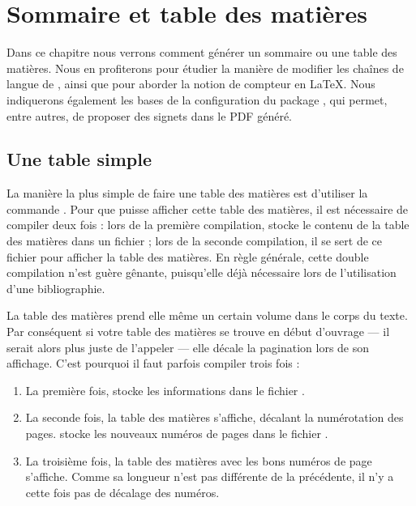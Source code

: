 \chapter{Sommaire et table des matières}\label{toc}

\begin{intro}
Dans ce chapitre nous verrons comment générer un sommaire ou une table des matières. Nous en profiterons pour étudier la manière de modifier les chaînes de langue de , ainsi que pour aborder la notion de compteur en \LaTeX{}. Nous indiquerons également les bases de la configuration du package , qui permet, entre autres, de proposer des signets dans le PDF généré.
\end{intro}

\section{Une table simple}

La manière la plus simple de faire une table des matières est d'utiliser la commande .
Pour que \XeLaTeX{} puisse afficher cette table des matières, il est nécessaire de compiler deux fois : lors de la première compilation, \XeLaTeX{} stocke le contenu de la table des matières dans un fichier  ; lors de la seconde compilation, il se sert de ce fichier pour afficher la table des matières. En règle générale, cette double compilation n'est guère gênante, puisqu'elle déjà nécessaire lors de l'utilisation d'une bibliographie.

\begin{attention}
La table des matières prend elle même un certain volume dans le corps du texte. Par conséquent si votre table des matières se trouve en début d'ouvrage --- il serait alors plus juste de l'appeler  --- elle décale la pagination lors de son affichage. C'est pourquoi il faut parfois compiler trois fois :

\begin{enumerate}
\item La première fois, \XeLaTeX{} stocke les informations dans le fichier .
\item La seconde fois, la table des matières  s'affiche, décalant la numérotation des pages. \XeLaTeX{}  stocke les nouveaux numéros de pages  dans le fichier .
\item La troisième fois, la table des matières avec les bons numéros de page   s'affiche. Comme sa longueur n'est pas différente de la précédente, il n'y a cette fois pas de décalage des numéros.
\end{enumerate}

\end{attention}

